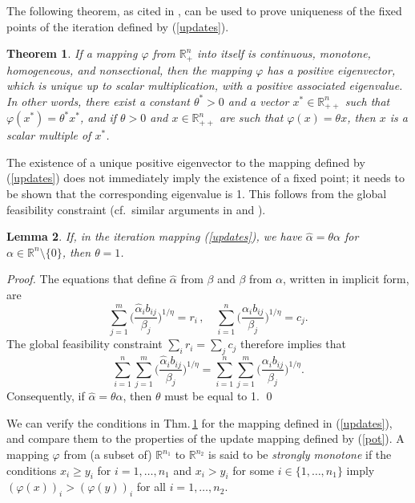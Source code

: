 \documentclass{article}
\newcommand{\mR}{\mathbb{R}}
\renewcommand{\phi}{\varphi}
\newcommand{\ed}[1]{{\rm #1}}
\newtheorem{theorem}{Theorem}[section]
\newtheorem{lemma}[theorem]{Lemma}
\theoremstyle{definition}
\begin{document}
The following theorem, as cited in \cite{PSW1}, can be used to prove uniqueness of the fixed points of the iteration defined by (\ref{updates}).

\begin{theorem} {\rm \cite[Thm.\,8, Remark 2]{Oshime}} \label{Oshime}
If a mapping $\phi$ from $\mR^n_+$ into itself is continuous, monotone,
homogeneous, and nonsectional, then the mapping $\phi$ has a
positive eigenvector, which is unique up to scalar multiplication, with a positive associated
eigenvalue. In other words, there exist
a constant $\theta^* > 0$ and a vector $x^* \in \mR^n_{++}$ such that $\phi(x^*)=
\theta^*x^*$, and if $\theta >0$ and $x \in \mR^n_{++}$ are such that $\phi(x)
=\theta x$, then $x$ is a scalar multiple of $x^*$.
\end{theorem}

The existence of a unique positive eigenvector to the mapping defined by (\ref{updates}) does not immediately imply the existence of a fixed point; it needs to be shown that the corresponding eigenvalue is 1. This follows from the global feasibility constraint (cf.\ similar arguments in \cite[p.\,246]{Menon} and \cite{PSW1}).

\begin{lemma} \label{lemma1}
If, in the iteration mapping \ed{(\ref{updates})}, we have $\hat{\alpha} = \theta \alpha$ for $\alpha \in \mR^n\setminus\{0\}$, then $\theta = 1$.
\end{lemma}

\begin{proof}
The equations that define $\hat{\alpha}$ from $\beta$ and $\beta$ from $\alpha$, written in implicit form, are
$$
\sum_{j=1}^m \Big( \frac{\hat{\alpha}_i b_{ij}}{\beta_j} \Big)^{1/\eta} = r_i\,, \quad
\sum_{i=1}^n \Big( \frac{\alpha_i b_{ij}}{\beta_j} \Big)^{1/\eta} = c_j.
$$
The global feasibility constraint $\sum_i r_i = \sum_j c_j$ therefore implies that
$$
\sum_{i=1}^n \sum_{j=1}^m \Big( \frac{\hat{\alpha}_i b_{ij}}{\beta_j} \Big)^{1/\eta} = \sum_{i=1}^n \sum_{j=1}^m \Big( \frac{\alpha_i b_{ij}}{\beta_j} \Big)^{1/\eta}.
$$
Consequently, if $\hat{\alpha} = \theta \alpha$, then $\theta$ must be equal to 1.
\qed
\end{proof}

We can verify the conditions in Thm.\,\ref{Oshime} for the mapping defined in (\ref{updates}), and compare them to the properties of the update mapping defined by (\ref{pot}). A mapping $\phi$ from (a subset of) $\mR^{n_1}$ to $\mR^{n_2}$ is said to be \emph{strongly monotone} if the conditions $x_i \geq y_i$ for $i = 1,\dots,n_1$ and $x_i > y_i$ for some $i \in \{1,\dots,n_1\}$ imply $(\phi(x))_i > (\phi(y))_i$ for all $i = 1,\dots,n_2$.
\end{document}
